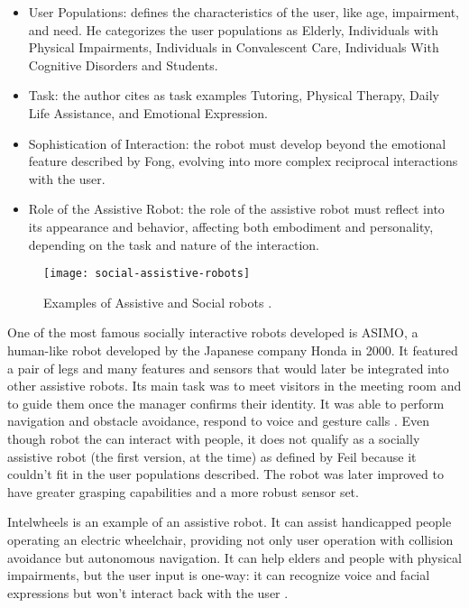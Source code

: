 \begin{itemize}
    \item User Populations: defines the characteristics of the user, like age, impairment, and need. He categorizes the user populations as Elderly, Individuals with Physical Impairments, Individuals in Convalescent Care, Individuals With Cognitive Disorders and Students.
    \item Task: the author cites as task examples Tutoring, Physical Therapy, Daily Life Assistance, and Emotional Expression. 
    \item Sophistication of Interaction: the robot must develop beyond the emotional feature described by Fong, evolving into more complex reciprocal interactions with the user.
    \item Role of the Assistive Robot: the role of the assistive robot must reflect into its appearance and behavior, affecting both embodiment and personality, depending on the task and nature of the interaction.
\end{itemize}

\begin{figure}[!ht]
    \centering
    \texttt{[image: social-assistive-robots]}
    \caption{Examples of Assistive and Social robots \cite{sakagami2002intelligent,braga2008intellwheels,tanaka2015pepper}.}
    \label{fig:social-assistive-robots}
\end{figure}

One of the most famous socially interactive robots developed is ASIMO, a human-like robot developed by the Japanese company Honda in 2000. It featured a pair of legs and many features and sensors that would later be integrated into other assistive robots. Its main task was to meet visitors in the meeting room and to guide them once the manager confirms their identity. It was able to perform navigation and obstacle avoidance, respond to voice and gesture calls \cite{sakagami2002intelligent}. Even though robot the can interact with people, it does not qualify as a socially assistive robot (the first version, at the time) as defined by Feil because it couldn't fit in the user populations described. The robot was later improved to have greater grasping capabilities and a more robust sensor set.

Intelwheels is an example of an assistive robot. It can assist handicapped people operating an electric wheelchair, providing not only user operation with collision avoidance but autonomous navigation. It can help elders and people with physical impairments, but the user input is one-way: it can recognize voice and facial expressions but won't interact back with the user \cite{braga2008intellwheels}.

